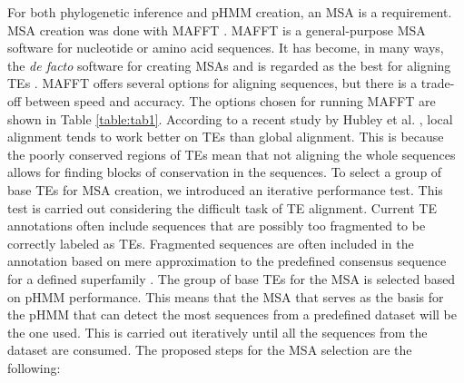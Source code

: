 \documentclass[unnumsec,webpdf,contemporary,large]{oup-authoring-template}%
\theoremstyle{thmstyleone}%
\theoremstyle{thmstyletwo}%
\theoremstyle{thmstylethree}%
\begin{document}
For both phylogenetic inference and pHMM creation, an MSA is a requirement. MSA creation was done with MAFFT \cite{katoh_mafft_2013}. MAFFT is a general-purpose MSA software for nucleotide or amino acid sequences. It has become, in many ways, the \textit{de facto} software for creating MSAs and is regarded as the best for aligning TEs \cite{hubley_accuracy_2022}. MAFFT offers several options for aligning sequences, but there is a trade-off between speed and accuracy. The options chosen for running MAFFT are shown in Table \ref{table:tab1}. According to a recent study by Hubley et al. \cite{hubley_accuracy_2022}, local alignment tends to work better on TEs than global alignment. This is because the poorly conserved regions of TEs mean that not aligning the whole sequences allows for finding blocks of conservation in the sequences.
To select a group of base TEs for MSA creation, we introduced an iterative performance test. This test is carried out considering the difficult task of TE alignment. Current TE annotations often include sequences that are possibly too fragmented to be correctly labeled as TEs. Fragmented sequences are often included in the annotation based on mere approximation to the predefined consensus sequence for a defined superfamily \cite{wells_field_2020, branco_overview_2023}. The group of base TEs for the MSA is selected based on pHMM performance. This means that the MSA that serves as the basis for the pHMM that can detect the most sequences from a predefined dataset will be the one used. This is carried out iteratively until all the sequences from the dataset are consumed. The proposed steps for the MSA selection are the following:
\end{document}
